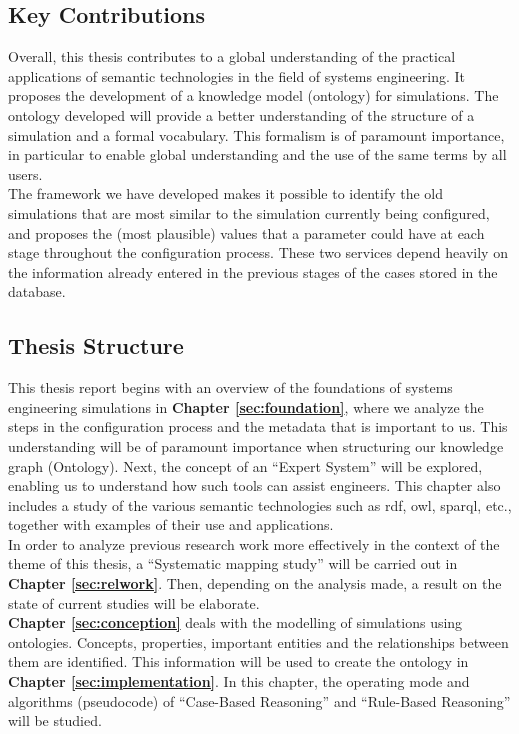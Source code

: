 \subsection{Key Contributions}
Overall, this thesis contributes to a global understanding of the practical applications of semantic technologies in the field of systems engineering. It proposes the development of a knowledge model (ontology) for simulations. The ontology developed will provide a better understanding of the structure of a simulation and a formal vocabulary. This formalism is of paramount importance, in particular to enable global understanding and the use of the same terms by all users.\\

The framework we have developed makes it possible to identify the old simulations that are most similar to the simulation currently being configured, and proposes the (most plausible) values that a parameter could have at each stage throughout the configuration process. These two services depend heavily on the information already entered in the previous stages of the cases stored in the database.


\subsection{Thesis Structure}
This thesis report begins with an overview of the foundations of systems engineering simulations in \textbf{Chapter \ref{sec:foundation}}, where we analyze the steps in the configuration process and the metadata that is important to us. This understanding will be of paramount importance when structuring our knowledge graph (Ontology). Next, the concept of an “Expert System” will be explored, enabling us to understand how such tools can assist engineers. This chapter also includes a study of the various semantic technologies such as \acrshort{rdf}, \acrshort{owl}, \acrshort{sparql}, etc., together with examples of their use and applications. \\

In order to analyze previous research work more effectively in the context of the theme of this thesis, a “Systematic mapping study” will be carried out in \textbf{Chapter \ref{sec:relwork}}. Then, depending on the analysis made, a result on the state of current studies will be elaborate.\\

\textbf{Chapter \ref{sec:conception}} deals with the modelling of simulations using ontologies. Concepts, properties, important entities and the relationships between them are identified. This information will be used to create the ontology in \textbf{Chapter \ref{sec:implementation}}. In this chapter, the operating mode and algorithms (pseudocode) of “Case-Based Reasoning” and “Rule-Based Reasoning” will be studied. \\

